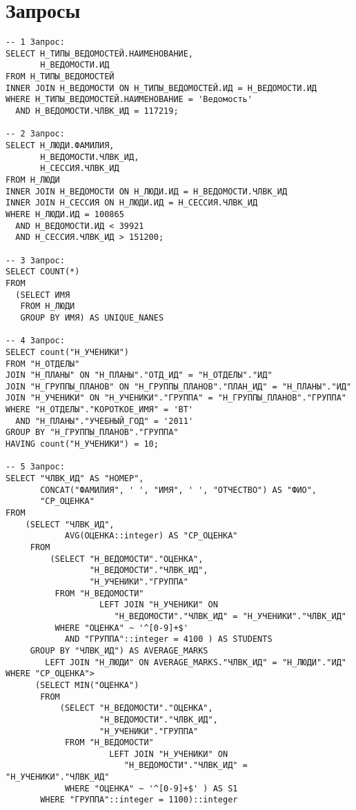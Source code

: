 \documentclass[14pt]{extreport}
\begin{document}
    \section{Запросы}
        \begin{verbatim}
-- 1 Запрос:
SELECT Н_ТИПЫ_ВЕДОМОСТЕЙ.НАИМЕНОВАНИЕ,
       Н_ВЕДОМОСТИ.ИД
FROM Н_ТИПЫ_ВЕДОМОСТЕЙ
INNER JOIN Н_ВЕДОМОСТИ ON Н_ТИПЫ_ВЕДОМОСТЕЙ.ИД = Н_ВЕДОМОСТИ.ИД
WHERE Н_ТИПЫ_ВЕДОМОСТЕЙ.НАИМЕНОВАНИЕ = 'Ведомость'
  AND Н_ВЕДОМОСТИ.ЧЛВК_ИД = 117219;

-- 2 Запрос:
SELECT Н_ЛЮДИ.ФАМИЛИЯ,
       Н_ВЕДОМОСТИ.ЧЛВК_ИД,
       Н_СЕССИЯ.ЧЛВК_ИД
FROM Н_ЛЮДИ
INNER JOIN Н_ВЕДОМОСТИ ON Н_ЛЮДИ.ИД = Н_ВЕДОМОСТИ.ЧЛВК_ИД
INNER JOIN Н_СЕССИЯ ON Н_ЛЮДИ.ИД = Н_СЕССИЯ.ЧЛВК_ИД
WHERE Н_ЛЮДИ.ИД = 100865
  AND Н_ВЕДОМОСТИ.ИД < 39921
  AND Н_СЕССИЯ.ЧЛВК_ИД > 151200;

-- 3 Запрос:
SELECT COUNT(*)
FROM
  (SELECT ИМЯ
   FROM Н_ЛЮДИ
   GROUP BY ИМЯ) AS UNIQUE_NANES

-- 4 Запрос:
SELECT count("Н_УЧЕНИКИ")
FROM "Н_ОТДЕЛЫ"
JOIN "Н_ПЛАНЫ" ON "Н_ПЛАНЫ"."ОТД_ИД" = "Н_ОТДЕЛЫ"."ИД"
JOIN "Н_ГРУППЫ_ПЛАНОВ" ON "Н_ГРУППЫ_ПЛАНОВ"."ПЛАН_ИД" = "Н_ПЛАНЫ"."ИД"
JOIN "Н_УЧЕНИКИ" ON "Н_УЧЕНИКИ"."ГРУППА" = "Н_ГРУППЫ_ПЛАНОВ"."ГРУППА"
WHERE "Н_ОТДЕЛЫ"."КОРОТКОЕ_ИМЯ" = 'ВТ'
  AND "Н_ПЛАНЫ"."УЧЕБНЫЙ_ГОД" = '2011'
GROUP BY "Н_ГРУППЫ_ПЛАНОВ"."ГРУППА"
HAVING count("Н_УЧЕНИКИ") = 10;

-- 5 Запрос:
SELECT "ЧЛВК_ИД" AS "НОМЕР",
       CONCAT("ФАМИЛИЯ", ' ', "ИМЯ", ' ', "ОТЧЕСТВО") AS "ФИО",
       "СР_ОЦЕНКА"
FROM
    (SELECT "ЧЛВК_ИД",
            AVG(ОЦЕНКА::integer) AS "СР_ОЦЕНКА"
     FROM
         (SELECT "Н_ВЕДОМОСТИ"."ОЦЕНКА",
                 "Н_ВЕДОМОСТИ"."ЧЛВК_ИД",
                 "Н_УЧЕНИКИ"."ГРУППА"
          FROM "Н_ВЕДОМОСТИ"
                   LEFT JOIN "Н_УЧЕНИКИ" ON
                      "Н_ВЕДОМОСТИ"."ЧЛВК_ИД" = "Н_УЧЕНИКИ"."ЧЛВК_ИД"
          WHERE "ОЦЕНКА" ~ '^[0-9]+$'
            AND "ГРУППА"::integer = 4100 ) AS STUDENTS
     GROUP BY "ЧЛВК_ИД") AS AVERAGE_MARKS
        LEFT JOIN "Н_ЛЮДИ" ON AVERAGE_MARKS."ЧЛВК_ИД" = "Н_ЛЮДИ"."ИД"
WHERE "СР_ОЦЕНКА">
      (SELECT MIN("ОЦЕНКА")
       FROM
           (SELECT "Н_ВЕДОМОСТИ"."ОЦЕНКА",
                   "Н_ВЕДОМОСТИ"."ЧЛВК_ИД",
                   "Н_УЧЕНИКИ"."ГРУППА"
            FROM "Н_ВЕДОМОСТИ"
                     LEFT JOIN "Н_УЧЕНИКИ" ON
                        "Н_ВЕДОМОСТИ"."ЧЛВК_ИД" = "Н_УЧЕНИКИ"."ЧЛВК_ИД"
            WHERE "ОЦЕНКА" ~ '^[0-9]+$' ) AS S1
       WHERE "ГРУППА"::integer = 1100)::integer


\end{verbatim}
\end{document}
